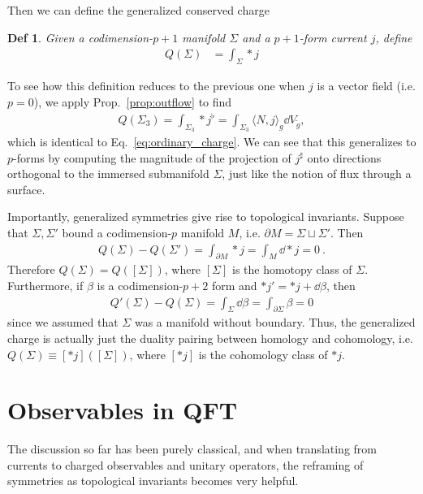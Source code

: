 \documentclass[11pt]{article}
\newtheorem{defn}{Def}
\begin{document}
Then we can define the generalized conserved charge
\begin{defn}
  Given a codimension-$p+1$ manifold $\Sigma$ and a $p+1$-form current $j$, define
  \begin{align}
    Q(\Sigma) &= \int_{\Sigma} *j
  \end{align}
\end{defn}
To see how this definition reduces to the previous one when $j$ is a vector
field (i.e. $p = 0$), we apply
Prop.~\ref{prop:outflow} to find
\begin{align}
Q(\Sigma_3) = \int_{\Sigma_3}*j^\flat = \int_{\Sigma_3}\langle N, j\rangle_{g}\dd V_{\tilde g},
\end{align}
which is identical to Eq.~\eqref{eq:ordinary_charge}. We can see that this
generalizes to $p$-forms by computing the magnitude of the projection of
$j^\sharp$ onto directions orthogonal to the immersed submanifold $\Sigma$,
just like the notion of flux through a surface.

Importantly, generalized symmetries give rise to topological invariants. Suppose
that $\Sigma, \Sigma'$ bound a codimension-$p$ manifold $M$, i.e. $\partial M = \Sigma \sqcup \Sigma'$. Then
\begin{align}
  Q(\Sigma) - Q(\Sigma') = \int_{\partial M}* j = \int_{M}\dd * j = 0 \ .
\end{align}
Therefore $Q(\Sigma) = Q([\Sigma])$, where $[\Sigma]$ is the homotopy class of
$\Sigma$. Furthermore, if $\beta$ is a codimension-$p+2$ form and $*j' = *j + \dd \beta$, then
\begin{align}
Q'(\Sigma) - Q(\Sigma) = \int_{\Sigma}\dd \beta = \int_{\partial \Sigma}\beta = 0
\end{align}
since we assumed that $\Sigma$ was a manifold without boundary. Thus, the
generalized charge is actually just the duality pairing between homology
and cohomology, i.e. $Q(\Sigma) \equiv [*j]([\Sigma])$, where $[*j]$ is the
cohomology class of $*j$.

\section{Observables in QFT}
The discussion so far has been purely classical, and when translating from
currents to charged observables and unitary operators, the reframing of
symmetries as topological invariants becomes very helpful.
\end{document}
